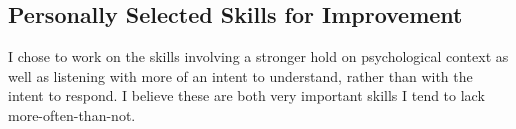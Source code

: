 \documentclass[stu,12pt]{apa7}
\begin{document}
    \subsection{Personally Selected Skills for Improvement}
      I chose to work on the skills involving a stronger hold on psychological
        context as well as listening with more of an intent to understand,
        rather than with the intent to respond. I believe these are both very
        important skills I tend to lack more-often-than-not.



\end{document}
